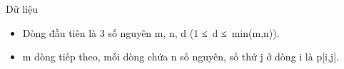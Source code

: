 Dữ liệu  
\begin{itemize}
	\item     Dòng đầu tiên là 3 số nguyên m, n, d (1 ≤ d ≤ min(m,n)).   
	\item     m dòng tiếp theo, mỗi dòng chứa n số nguyên, số thứ j ở dòng i là p[i,j].   
\end{itemize}